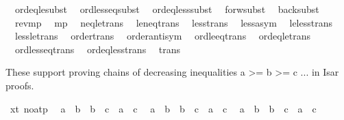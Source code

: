 \begin{isabellebody}
\ \ ord{\isacharunderscore}{\kern0pt}eq{\isacharunderscore}{\kern0pt}le{\isacharunderscore}{\kern0pt}subst\isanewline
\ \ ord{\isacharunderscore}{\kern0pt}less{\isacharunderscore}{\kern0pt}eq{\isacharunderscore}{\kern0pt}subst\isanewline
\ \ ord{\isacharunderscore}{\kern0pt}eq{\isacharunderscore}{\kern0pt}less{\isacharunderscore}{\kern0pt}subst\isanewline
\ \ forw{\isacharunderscore}{\kern0pt}subst\isanewline
\ \ back{\isacharunderscore}{\kern0pt}subst\isanewline
\ \ rev{\isacharunderscore}{\kern0pt}mp\isanewline
\ \ mp\isanewline
\ \ neq{\isacharunderscore}{\kern0pt}le{\isacharunderscore}{\kern0pt}trans\isanewline
\ \ le{\isacharunderscore}{\kern0pt}neq{\isacharunderscore}{\kern0pt}trans\isanewline
\ \ less{\isacharunderscore}{\kern0pt}trans\isanewline
\ \ less{\isacharunderscore}{\kern0pt}asym{\isacharprime}{\kern0pt}\isanewline
\ \ le{\isacharunderscore}{\kern0pt}less{\isacharunderscore}{\kern0pt}trans\isanewline
\ \ less{\isacharunderscore}{\kern0pt}le{\isacharunderscore}{\kern0pt}trans\isanewline
\ \ order{\isacharunderscore}{\kern0pt}trans\isanewline
\ \ order{\isachardot}{\kern0pt}antisym\isanewline
\ \ ord{\isacharunderscore}{\kern0pt}le{\isacharunderscore}{\kern0pt}eq{\isacharunderscore}{\kern0pt}trans\isanewline
\ \ ord{\isacharunderscore}{\kern0pt}eq{\isacharunderscore}{\kern0pt}le{\isacharunderscore}{\kern0pt}trans\isanewline
\ \ ord{\isacharunderscore}{\kern0pt}less{\isacharunderscore}{\kern0pt}eq{\isacharunderscore}{\kern0pt}trans\isanewline
\ \ ord{\isacharunderscore}{\kern0pt}eq{\isacharunderscore}{\kern0pt}less{\isacharunderscore}{\kern0pt}trans\isanewline
\ \ trans%
\begin{isamarkuptext}%
These support proving chains of decreasing inequalities
    a >= b >= c ... in Isar proofs.%
\end{isamarkuptext}\isamarkuptrue%
\isamarkupfalse%
\ xt{}\ {\isacharbrackleft}{\kern0pt}no{\isacharunderscore}{\kern0pt}atp{\isacharbrackright}{\kern0pt}{\isacharcolon}{\kern0pt}\isanewline
\ \ {\isachardoublequoteopen}a\ {\isacharequal}{\kern0pt}\ b\ {\isasymLongrightarrow}\ b\ {\isachargreater}{\kern0pt}\ c\ {\isasymLongrightarrow}\ a\ {\isachargreater}{\kern0pt}\ c{\isachardoublequoteclose}\isanewline
\ \ {\isachardoublequoteopen}a\ {\isachargreater}{\kern0pt}\ b\ {\isasymLongrightarrow}\ b\ {\isacharequal}{\kern0pt}\ c\ {\isasymLongrightarrow}\ a\ {\isachargreater}{\kern0pt}\ c{\isachardoublequoteclose}\isanewline
\ \ {\isachardoublequoteopen}a\ {\isacharequal}{\kern0pt}\ b\ {\isasymLongrightarrow}\ b\ {\isasymge}\ c\ {\isasymLongrightarrow}\ a\ {\isasymge}\ c{\isachardoublequoteclose}\isanewline

\end{isabellebody}
